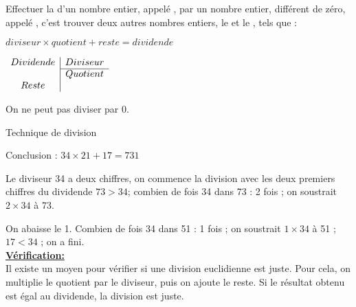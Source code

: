 
\begin{mydef}
	Effectuer la  d’un nombre entier, appelé , par un nombre entier, différent de zéro, appelé , c’est trouver deux autres nombres entiers, le  et le , tels que : 
	
	$diviseur \times quotient + reste = dividende$
	
\end{mydef}


\begin{center}
	$\begin{array}{c|c}
		Dividende & Diviseur \\
		\cline{2-2}
				& Quotient \\
		Reste & \\
	\end{array}$
\end{center}

\begin{mywarning}
	On ne peut pas diviser par 0.
\end{mywarning}


\vspace*{-1cm}	

\begin{mymethname}{Technique de division}
\begin{multicols}{2}
	\begin{center}
	\end{center}

Conclusion : $34 \times 21 + 17 = 731$
\end{multicols}


Le diviseur 34 a deux chiffres, on commence la division avec les deux premiers chiffres du dividende $73 > 34 $; 
combien de fois 34 dans 73 : 2 fois ; on soustrait $2 \times 34$ à 73.

On abaisse le 1. 
Combien de fois 34 dans 51 : 1 fois ; 
on soustrait $1 \times 34$ à 51 ; $17 < 34$ ; on a fini.\\


\textbf{\underline{Vérification:}}\\
Il existe un moyen pour vérifier si une division euclidienne est juste. 
Pour cela, on multiplie le quotient par le diviseur, puis on ajoute le reste. 
Si le résultat obtenu est égal au dividende, la division est juste.
\end{mymethname}


